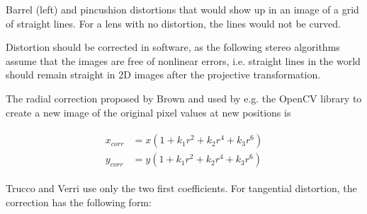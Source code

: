{Barrel (left) and pincushion distortions that would show up in an image of a grid of straight lines. For a lens with no distortion, the lines would not be curved.}

Distortion should be corrected in software, as the following stereo algorithms assume that the images are free of nonlinear errors, i.e. straight lines in the world should remain straight in 2D images after the projective transformation.

The radial correction proposed by Brown \cite{brown1966decentering} and used by e.g. the OpenCV library \cite{opencv} to create a new image of the original pixel values at new positions is

\begin{align} \label{equ:radialdist} \begin{split}
	x_{corr} &= x(1 + k_1 r^2 + k_2 r^4 + k_3 r^6)\\
	y_{corr} &= y(1 + k_1 r^2 + k_2 r^4 + k_3 r^6)
\end{split} \end{align}



Trucco and Verri \cite{trucco1998introductory} use only the two first coefficients. For tangential distortion, the correction has the following form:

